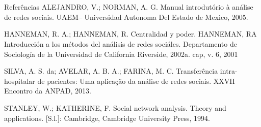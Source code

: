 \documentclass[10pt]{beamer}
\begin{document}
\section{}
\subsection{}
\begin{frame}{Referências}{}
ALEJANDRO, V.; NORMAN, A. G. Manual introdutório à análise de redes sociais. UAEM–
Universidad Autonoma Del Estado de Mexico, 2005.

HANNEMAN, R. A.; HANNEMAN, R. Centralidad y poder. HANNEMAN, RA Introducción
a los métodos del análisis de redes sociáles. Departamento de Sociología de la Universidad
de California Riverside, 2002a. cap, v. 6, 2001

SILVA, A. S. da; AVELAR, A. B. A.; FARINA, M. C. Transferência intra-hospitalar de pacientes:
Uma aplicação da análise de redes sociais. XXVII Encontro da ANPAD, 2013.

STANLEY, W.; KATHERINE, F. Social network analysis. Theory and applications. [S.l.]:
Cambridge, Cambridge University Press, 1994.
\end{frame}




{\1
\begin{frame}
\end{frame}}
\end{document}

